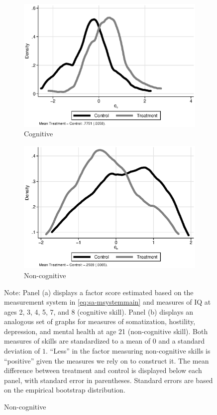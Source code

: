 \begin{figure}[!htbp]
\centering
\caption{Estimates of Cognitive ($\theta_{c}^d$) and Non-cognitive Skills ($\theta_{nc}^d$)}\label{figure:factorsm}
\begin{subfigure}[h]{0.5\textwidth}
		\centering
		\caption{Cognitive} \label{fig:c}
		\includegraphics[width=\textwidth]{output/abccare_cfactor.eps}
\end{subfigure}%
\begin{subfigure}[h]{0.5\textwidth}
	\centering
	\caption{Non-cognitive} \label{fig:n}
		\includegraphics[width=\textwidth]{output/abccare_nfactor.eps}
\end{subfigure}
\footnotesize \justify
Note: Panel (a) displays a factor score estimated based on the measurement system in \eqref{eq:sa-msystemmain} and measures of IQ at ages 2, 3, 4, 5, 7, and 8 (cognitive skill). Panel (b) displays an analogous set of graphs for measures of somatization, hostility, depression, and mental health at age 21 (non-cognitive skill). Both measures of skills are standardized to a mean of $0$ and a standard deviation of $1$. ``Less'' in the factor measuring non-cognitive skills is ``positive'' given the measures we rely on to construct it. The mean difference between treatment and control is displayed below each panel, with standard error in parentheses. Standard errors are based on the empirical bootstrap distribution.
\end{figure}

